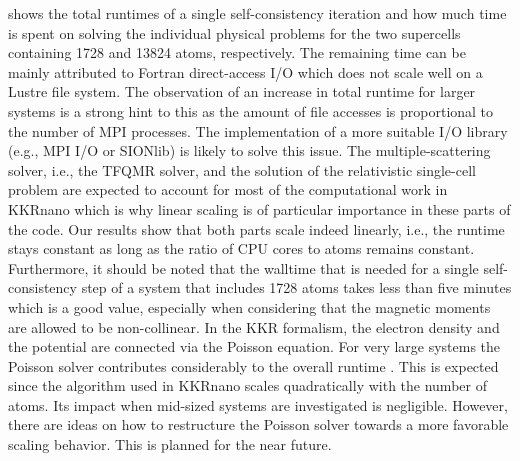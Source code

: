 \documentclass[graybox]{svmult}
\begin{document}
shows the total runtimes of a single self-consistency iteration and how much time is spent
on solving the individual physical problems for the two supercells containing 1728 and 13824 atoms, respectively.
The remaining time
can be mainly attributed to Fortran direct-access I/O which does not scale well on a Lustre file system.
The observation of an increase in total runtime for larger systems is a strong hint to this as the amount of
file accesses is proportional to the number of MPI processes.
The implementation of a more suitable I/O library (e.g., MPI I/O or SIONlib) is likely to solve this issue.
The multiple-scattering solver, i.e., the TFQMR solver, 
and the solution of the relativistic single-cell problem are
expected to account for most of the computational work in KKRnano which 
is why linear scaling is of particular importance in these parts of the code.
Our results show that both parts scale indeed linearly, i.e., the runtime stays constant as long as
the ratio of CPU cores to atoms remains constant.
Furthermore, it should be noted that the walltime that is needed for a single self-consistency step of a system
that includes 1728 atoms
takes less than five minutes which is a good value, especially when considering that
the magnetic moments are allowed to be non-collinear.
In the KKR formalism, the electron density and the potential are connected via the Poisson equation. 
For very large systems the Poisson solver contributes considerably
to the overall runtime \cite{brommel_juqueen_2017}.
This is expected since the algorithm used in KKRnano scales
quadratically with the number of atoms. Its impact when mid-sized systems are investigated is negligible. 
However, there are ideas on how to restructure the Poisson solver towards a more favorable scaling behavior.
This is planned for the near future.
\end{document}
